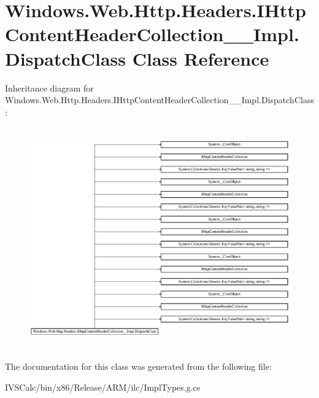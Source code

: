 \hypertarget{class_windows_1_1_web_1_1_http_1_1_headers_1_1_i_http_content_header_collection_____impl_1_1_dispatch_class}{}\section{Windows.\+Web.\+Http.\+Headers.\+I\+Http\+Content\+Header\+Collection\+\_\+\+\_\+\+Impl.\+Dispatch\+Class Class Reference}
\label{class_windows_1_1_web_1_1_http_1_1_headers_1_1_i_http_content_header_collection_____impl_1_1_dispatch_class}
Inheritance diagram for Windows.\+Web.\+Http.\+Headers.\+I\+Http\+Content\+Header\+Collection\+\_\+\+\_\+\+Impl.\+Dispatch\+Class\+:\begin{figure}[H]
\begin{center}
\leavevmode
\includegraphics[height=9.593147cm]{class_windows_1_1_web_1_1_http_1_1_headers_1_1_i_http_content_header_collection_____impl_1_1_dispatch_class}
\end{center}
\end{figure}


The documentation for this class was generated from the following file\+:\begin{DoxyCompactItemize}
\item 
I\+V\+S\+Calc/bin/x86/\+Release/\+A\+R\+M/ilc/Impl\+Types.\+g.\+cs\end{DoxyCompactItemize}
